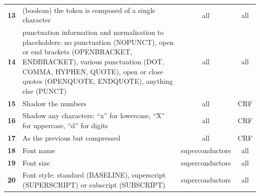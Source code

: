 \begin{table}
\begin{tabular}{l m{30em} c c}
        \textbf{13}   & (boolean) the token is composed of a single character                                                                                                                                                                                                    & all             & all                   \\
        \textbf{14}   & punctuation information and normalisation to placeholders: no punctuation (NOPUNCT), open or end brackets (OPENBRACKET, ENDBRACKET), various punctuation (DOT, COMMA, HYPHEN, QUOTE), open or close quotes (OPENQUOTE, ENDQUOTE), anything else (PUNCT) & all             & all                   \\
        \textbf{15}   & Shadow the numbers                                                                                                                                                                                                                                       & all             & CRF                   \\
        \textbf{16}   & Shadow any characters: ``x'' for lowercase, ``X'' for uppercase, ``d'' for digits                                                                                                                                                                        & all             & CRF                   \\
        \textbf{17}   & As the previous but compressed                                                                                                                                                                                                                           & all             & CRF                   \\
        \textbf{18}   & Font name                                                                                                                                                                                                                                                & superconductors & all                   \\
        \textbf{19}   & Font size                                                                                                                                                                                                                                                & superconductors & all                   \\
        \textbf{20}   & Font style: standard (BASELINE), superscript (SUPERSCRIPT) or subscript (SUBSCRIPT)   & superconductors & all                   \\

\end{tabular}
\end{table}

